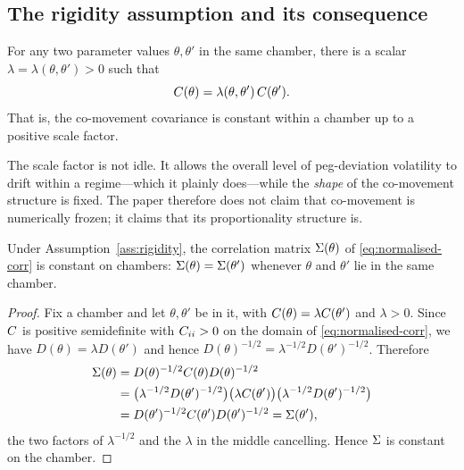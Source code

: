 \subsection{The rigidity assumption and its consequence}\label{sec:rigidity-thm}
\begin{assumption}\label{ass:rigidity}
For any two parameter values $\theta, \theta'$ in the same chamber, there is a scalar $\lambda = \lambda(\theta,\theta')>0$ such that
\[
C(\theta) = \lambda(\theta,\theta')\,C(\theta').
\]
That is, the co-movement covariance is constant within a chamber up to a positive scale factor.
\end{assumption}

The scale factor is not idle. It allows the overall level of peg-deviation volatility to drift within a regime---which it plainly does---while the \emph{shape} of the co-movement structure is fixed. The paper therefore does not claim that co-movement is numerically frozen; it claims that its proportionality structure is.

\begin{theorem}\label{thm:rigidity}
Under Assumption~\ref{ass:rigidity}, the correlation matrix $\Sigma(\theta)$ of \eqref{eq:normalised-corr} is constant on chambers: $\Sigma(\theta) = \Sigma(\theta')$ whenever $\theta$ and $\theta'$ lie in the same chamber.
\end{theorem}
\begin{proof}
Fix a chamber and let $\theta,\theta'$ be in it, with $C(\theta) = \lambda C(\theta')$ and $\lambda>0$. Since $C$ is positive semidefinite with $C_{ii}>0$ on the domain of \eqref{eq:normalised-corr}, we have $D(\theta) = \lambda D(\theta')$ and hence $D(\theta)^{-1/2} = \lambda^{-1/2}D(\theta')^{-1/2}$. Therefore
\begin{equation*}
\begin{split}
\Sigma(\theta)
&= D(\theta)^{-1/2}C(\theta)D(\theta)^{-1/2} \\
&= \bigl(\lambda^{-1/2}D(\theta')^{-1/2}\bigr)\bigl(\lambda C(\theta')\bigr)
   \bigl(\lambda^{-1/2}D(\theta')^{-1/2}\bigr) \\
&= D(\theta')^{-1/2}C(\theta')D(\theta')^{-1/2} = \Sigma(\theta'),
\end{split}
\end{equation*}
the two factors of $\lambda^{-1/2}$ and the $\lambda$ in the middle cancelling. Hence $\Sigma$ is constant on the chamber.
\end{proof}

